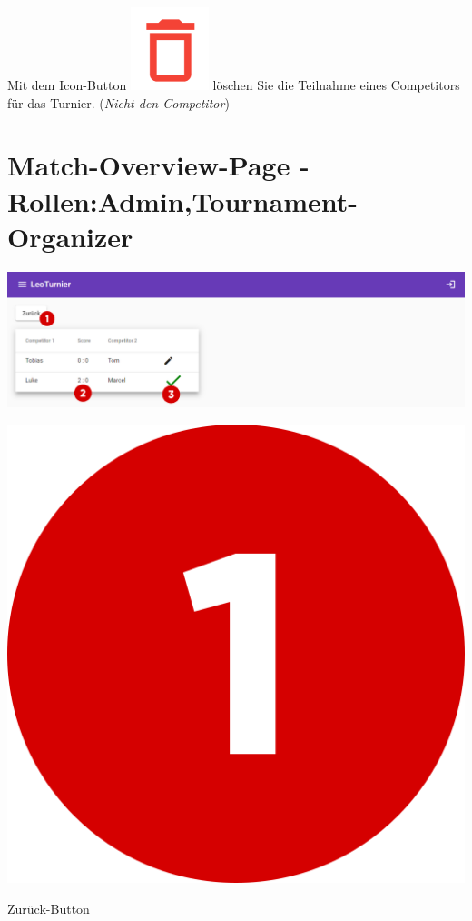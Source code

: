 Mit dem Icon-Button \includegraphics[scale=0.3]{pics/user-guide/delete-icon.PNG} löschen Sie die Teilnahme eines Competitors für das Turnier. (\textit{Nicht den Competitor})

\newpage
\section{Match-Overview-Page - Rollen:Admin,Tournament-Organizer}
\includegraphics[scale=0.4]{pics/user-guide/match-overview-page.PNG} 

\bigskip
\includegraphics[scale=0.05]{pics/user-guide/numbers/number-1.png} \begin{LARGE} Zurück-Button \end{LARGE}

